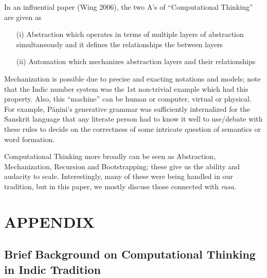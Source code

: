 In an influential paper (Wing 2006), the two A’s of “Computational Thinking” are given as 
\begin{itemize}
\item[(i)] Abstraction which operates in terms of multiple layers of abstraction simultaneously and it defines the relationships the between layers

\item[(ii)] Automation which mechanizes abstraction layers and their relationships
\end{itemize}

Mechanization is possible due to precise and exacting notations and models; note that the Indic number system was the 1st non-trivial example which had this property. Also, this “machine” can be human or computer, virtual or physical. For example, Pāṇini’s generative grammar was sufficiently internalized for the Sanskrit language that any literate person had to know it well to use/debate with these rules to decide on the correctness of some intricate question of semantics or word formation.

Computational Thinking more broadly can be seen as Abstraction, Mechanization, Recursion and Bootstrapping; these give us the ability and audacity to scale. Interestingly, many of these were being handled in our tradition, but in this paper, we mostly discuss those connected with \textsl{rasa}.

\section{APPENDIX}\label{chap7-app2}

\subsection*{Brief Background on Computational Thinking in Indic Tradition}

